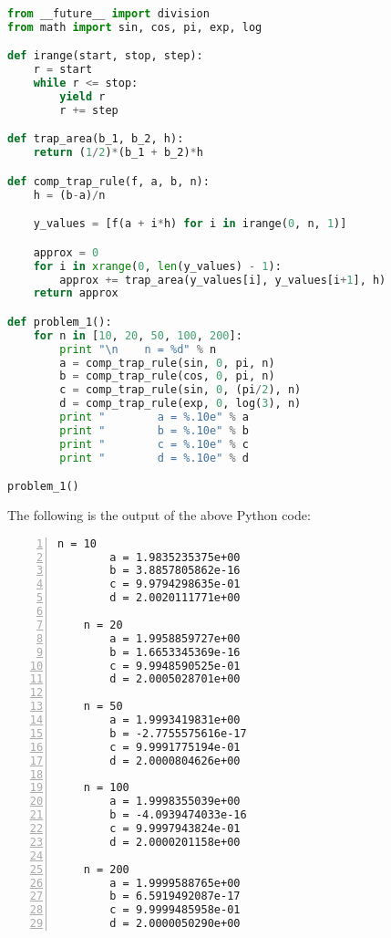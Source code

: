 \documentclass[12pt]{article}
\begin{document}
\begin{lstlisting}[language=Python, caption=Problem 1 source code]
from __future__ import division
from math import sin, cos, pi, exp, log

def irange(start, stop, step):
    r = start
    while r <= stop:
        yield r
        r += step

def trap_area(b_1, b_2, h):
    return (1/2)*(b_1 + b_2)*h

def comp_trap_rule(f, a, b, n):
    h = (b-a)/n

    y_values = [f(a + i*h) for i in irange(0, n, 1)]

    approx = 0
    for i in xrange(0, len(y_values) - 1):
        approx += trap_area(y_values[i], y_values[i+1], h)
    return approx

def problem_1():
    for n in [10, 20, 50, 100, 200]:
        print "\n    n = %d" % n
        a = comp_trap_rule(sin, 0, pi, n)
        b = comp_trap_rule(cos, 0, pi, n)
        c = comp_trap_rule(sin, 0, (pi/2), n)
        d = comp_trap_rule(exp, 0, log(3), n)
        print "        a = %.10e" % a
        print "        b = %.10e" % b
        print "        c = %.10e" % c
        print "        d = %.10e" % d

problem_1()
\end{lstlisting}
The following is the output of the above Python code:
\begin{Verbatim}[fontfamily=courier, numbers=left, numbersep=2pt, fontsize=\small]
    n = 10
        a = 1.9835235375e+00
        b = 3.8857805862e-16
        c = 9.9794298635e-01
        d = 2.0020111771e+00

    n = 20
        a = 1.9958859727e+00
        b = 1.6653345369e-16
        c = 9.9948590525e-01
        d = 2.0005028701e+00

    n = 50
        a = 1.9993419831e+00
        b = -2.7755575616e-17
        c = 9.9991775194e-01
        d = 2.0000804626e+00

    n = 100
        a = 1.9998355039e+00
        b = -4.0939474033e-16
        c = 9.9997943824e-01
        d = 2.0000201158e+00

    n = 200
        a = 1.9999588765e+00
        b = 6.5919492087e-17
        c = 9.9999485958e-01
        d = 2.0000050290e+00
\end{Verbatim}
\end{document}
